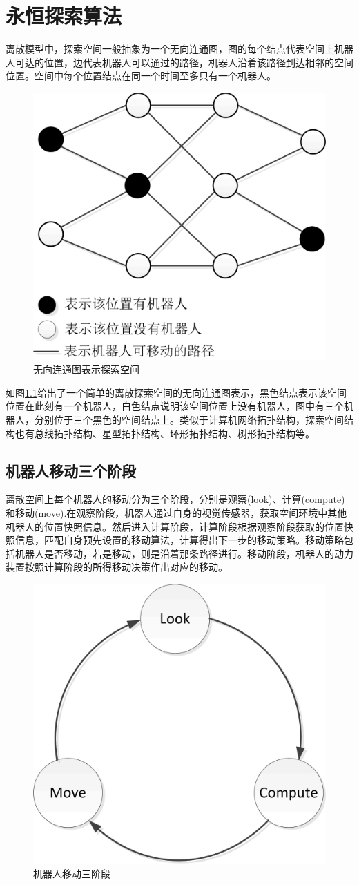 \chapter{永恒探索算法}

离散模型中，探索空间一般抽象为一个无向连通图，图的每个结点代表空间上机器人可达的位置，边代表机器人可以通过的路径，机器人沿着该路径到达相邻的空间位置。空间中每个位置结点在同一个时间至多只有一个机器人。

\begin{figure}[!hbt]
	\centering
	\includegraphics[width=3 in]{fig/normalspace.png}
	\caption{无向连通图表示探索空间}
	\label{fig:normalspace}
\end{figure}

如图\ref{fig:normalspace}给出了一个简单的离散探索空间的无向连通图表示，黑色结点表示该空间位置在此刻有一个机器人，白色结点说明该空间位置上没有机器人，图中有三个机器人，分别位于三个黑色的空间结点上。类似于计算机网络拓扑结构，探索空间结构也有总线拓扑结构、星型拓扑结构、环形拓扑结构、树形拓扑结构等。

\section{机器人移动三个阶段}
离散空间上每个机器人的移动分为三个阶段，分别是观察(look)、计算(compute)和移动(move).在观察阶段，机器人通过自身的视觉传感器，获取空间环境中其他机器人的位置快照信息。然后进入计算阶段，计算阶段根据观察阶段获取的位置快照信息，匹配自身预先设置的移动算法，计算得出下一步的移动策略。移动策略包括机器人是否移动，若是移动，则是沿着那条路径进行。移动阶段，机器人的动力装置按照计算阶段的所得移动决策作出对应的移动。

\begin{figure}[!hbt]
	\centering
	\includegraphics[width=3 in]{fig/robotthreephase.png}
	\caption{机器人移动三阶段}
	\label{fig:robotthreephase}
\end{figure}

